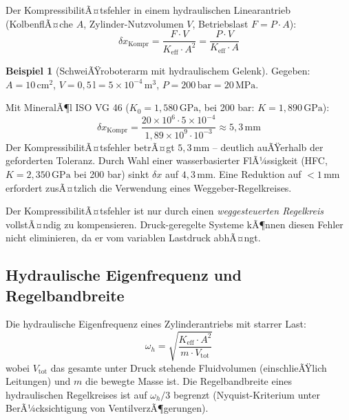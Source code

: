 ﻿\documentclass[a4paper,12pt]{scrreprt}
\theoremstyle{definition}
\newtheorem{beispiel}{Beispiel}[section]
\begin{document}
Der KompressibilitÃ¤tsfehler in einem hydraulischen Linearantrieb
(KolbenflÃ¤che $A$, Zylinder-Nutzvolumen $V$, Betriebslast $F = P \cdot A$):
\begin{equation}
  \delta x_{\mathrm{Kompr}} = \frac{F \cdot V}{K_{\mathrm{eff}} \cdot A^2}
    = \frac{P \cdot V}{K_{\mathrm{eff}} \cdot A}
  \label{eq:kompr_fehler}
\end{equation}

\begin{beispiel}[SchweiÃŸroboterarm mit hydraulischem Gelenk]
  Gegeben: $A = 10\,\mathrm{cm}^2$, $V = 0{,}5\,\mathrm{l} = 5 \times 10^{-4}\,\mathrm{m}^3$,
  $P = 200\,\mathrm{bar} = 20\,\mathrm{MPa}$.

  Mit MineralÃ¶l ISO VG 46 ($K_0 = 1{,}580\,\mathrm{GPa}$, bei 200 bar:
  $K = 1{,}890\,\mathrm{GPa}$):
  \[
    \delta x_{\mathrm{Kompr}}
      = \frac{20 \times 10^6 \cdot 5 \times 10^{-4}}{1{,}89 \times 10^9 \cdot 10^{-3}}
      \approx 5{,}3\,\mathrm{mm}
  \]
  Der KompressibilitÃ¤tsfehler betrÃ¤gt $5{,}3\,\mathrm{mm}$ -- deutlich
  auÃŸerhalb der geforderten Toleranz. Durch Wahl einer wasserbasierter
  FlÃ¼ssigkeit (HFC, $K = 2{,}350\,\mathrm{GPa}$ bei 200 bar) sinkt
  $\delta x$ auf $4{,}3\,\mathrm{mm}$. Eine Reduktion auf $< 1\,\mathrm{mm}$
  erfordert zusÃ¤tzlich die Verwendung eines Weggeber-Regelkreises.
\end{beispiel}

Der KompressibilitÃ¤tsfehler ist nur durch einen \emph{weggesteuerten Regelkreis}
vollstÃ¤ndig zu kompensieren. Druck-geregelte Systeme kÃ¶nnen diesen Fehler
nicht eliminieren, da er vom variablen Lastdruck abhÃ¤ngt.

\subsection{Hydraulische Eigenfrequenz und Regelbandbreite}

Die hydraulische Eigenfrequenz eines Zylinderantriebs mit starrer Last:
\begin{equation}
  \omega_h = \sqrt{\frac{K_{\mathrm{eff}} \cdot A^2}{m \cdot V_{\mathrm{tot}}}}
  \label{eq:hydraul_eigenfreq}
\end{equation}
wobei $V_{\mathrm{tot}}$ das gesamte unter Druck stehende Fluidvolumen
(einschlieÃŸlich Leitungen) und $m$ die bewegte Masse ist. Die Regelbandbreite
eines hydraulischen Regelkreises ist auf $\omega_h / 3$ begrenzt (Nyquist-Kriterium
unter BerÃ¼cksichtigung von VentilverzÃ¶gerungen).
\end{document}
